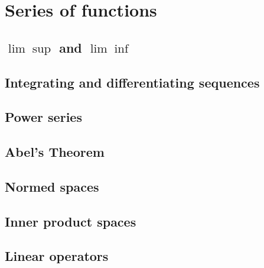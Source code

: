 \chapter{Series of functions}

\section{\( \lim \sup \) and \( \lim \inf \)}
\section{Integrating and differentiating sequences}
\section{Power series}
\section{Abel's Theorem}
\section{Normed spaces}
\section{Inner product spaces}
\section{Linear operators}


